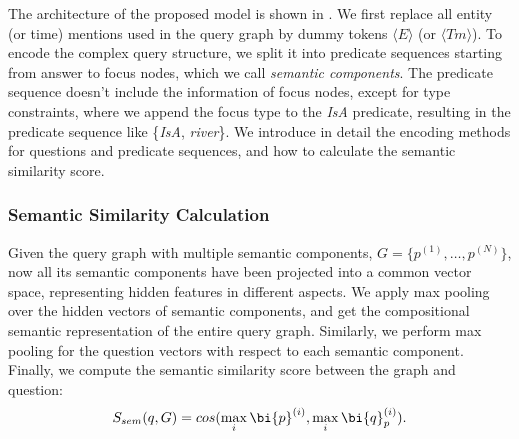 The architecture of the proposed model is shown in .
We first replace all entity (or time) mentions used in the query graph
by dummy tokens $\langle E \rangle$ (or $\langle Tm \rangle$).
To encode the complex query structure,
we split it into predicate sequences starting from answer to focus nodes,
which we call \textit{semantic components}.
The predicate sequence doesn't include the information of focus nodes,
except for type constraints, where we append the focus type to the \textit{IsA} predicate,
resulting in the predicate sequence like \{\textit{IsA}, \textit{river}\}.
We introduce in detail the encoding methods for questions and predicate sequences,
and how to calculate the semantic similarity score.









\subsubsection{Semantic Similarity Calculation}

Given the query graph with multiple semantic components, $G = \{p^{(1)}, \dots, p^{(N)}\}$,
now all its semantic components have been projected into a common vector space,
representing hidden features in different aspects.
We apply max pooling over the hidden vectors of semantic components,
and get the compositional semantic representation of the entire query graph.
Similarly, we perform max pooling for the question vectors 
with respect to each semantic component.
Finally, we compute the semantic similarity score between the graph and question:
\begin{equation}
S_{sem}(q, G) = cos(\max_{i}{\bi{p}^{(i)}}, \max_{i}{\bi{q}_p^{(i)}}).
\end{equation}

